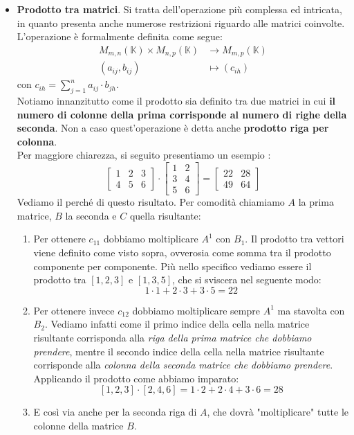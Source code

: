 \documentclass[12pt]{report}
\newcommand{\K}{\mathbb{K}}
\begin{document}
\begin{itemize}
		\item \textbf{Prodotto tra matrici}. Si tratta dell'operazione più complessa ed intricata, in quanto presenta anche numerose restrizioni riguardo alle matrici coinvolte.\\
		L'operazione è formalmente definita come segue:
		\[
			\begin{aligned}
				M_{m,n}(\K) \times M_{n,p}(\K) &\to M_{m, p}(\K)\\
				(a_{ij}, b_{ij}) &\mapsto (c_{ih})	
			\end{aligned}
		\]
		con $c_{ih} = \sum_{j = 1}^{n} a_{ij} \cdot b_{jh}$.\\
		Notiamo innanzitutto come il prodotto sia definito tra due matrici in cui \textbf{il numero di colonne della prima corrisponde al numero di righe della seconda}. Non a caso quest'operazione è detta anche \textbf{prodotto riga per colonna}.\\
		Per maggiore chiarezza, si seguito presentiamo un esempio :
		\[
			\begin{bmatrix}
				1 & 2 & 3\\
				4 & 5 & 6
			\end{bmatrix}
			\cdot
			\begin{bmatrix}
				1 & 2\\
				3 & 4\\
				5 & 6
			\end{bmatrix}
			=
			\begin{bmatrix}
				22 & 28\\
				49 & 64
			\end{bmatrix}
		\]
		Vediamo il perché di questo risultato. Per comodità chiamiamo $A$ la prima matrice, $B$ la seconda e $C$ quella risultante:
		\begin{enumerate}
			\item Per ottenere $c_{11}$ dobbiamo moltiplicare $A^1$ con $B_1$. Il prodotto tra vettori viene definito come visto sopra, ovverosia come somma tra il prodotto componente per componente. Più nello specifico vediamo essere il prodotto tra $[1, 2, 3]$ e $[1, 3, 5]$, che si sviscera nel seguente modo:
			\[
				1 \cdot 1 + 2 \cdot 3 + 3 \cdot 5 = 22
			\]
			\item Per ottenere invece $c_{12}$ dobbiamo moltiplicare sempre $A^1$ ma stavolta con $B_2$. Vediamo infatti come il primo indice della cella nella matrice risultante corrisponda alla \textit{riga della prima matrice che dobbiamo prendere}, mentre il secondo indice della cella nella matrice risultante corrisponde alla \textit{colonna della seconda matrice che dobbiamo prendere}.\\
			Applicando il prodotto come abbiamo imparato:
			\[
				[1, 2, 3] \cdot [2, 4, 6] = 1 \cdot 2 + 2 \cdot 4 + 3 \cdot 6 = 28
			\]
			\item E così via anche per la seconda riga di $A$, che dovrà "moltiplicare" tutte le colonne della matrice $B$.
		\end{enumerate}
		
	\end{itemize}
	
\end{document}
